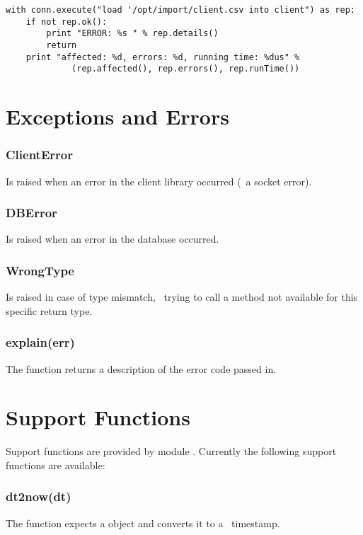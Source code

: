 \begin{python}
\begin{lstlisting}
with conn.execute("load '/opt/import/client.csv into client") as rep:
    if not rep.ok():
        print "ERROR: %s " % rep.details()
        return
    print "affected: %d, errors: %d, running time: %dus" % 
             (rep.affected(), rep.errors(), rep.runTime())
\end{lstlisting}
\end{python}

\section{Exceptions and Errors}
\subsubsection{ClientError}
Is raised when an error in the client library occurred
(\eg\ a socket error).

\subsubsection{DBError}
Is raised when an error in the database occurred.

\subsubsection{WrongType}
Is raised in case of type mismatch, \ie\
trying to call a method not available for
this specific return type.

\subsubsection{explain(err)}
The function  returns
a description of the error code passed in.

\section{Support Functions}\label{sec_supp}
Support functions are provided by module
. Currently the following
support functions are available:

\subsubsection{dt2now(dt)}
The function expects a 
object and converts it to a \nowdb\ timestamp.

